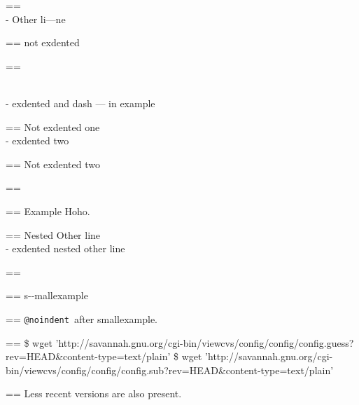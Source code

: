 \documentclass{book}
\makeatletter
\newenvironment{Texinfopreformatted}{%
  \par\GNUTobeylines\obeyspaces\frenchspacing\parskip=\z@\parindent=\z@}{}
{\catcode`\^^M=13 \gdef\GNUTobeylines{\catcode`\^^M=13 \def^^M{\null\par}}}
\newenvironment{Texinfoindented}{\begin{list}{}{}\item\relax}{\end{list}}
\renewcommand{\_}{\Texinfounderscore\discretionary{}{}{}}
\makeatother
\begin{document}
\begin{Texinfoindented}
\begin{Texinfoindented}
\begin{Texinfopreformatted}
\end{Texinfopreformatted}
\leavevmode{}\\
\hbox{\kern -\leftmargin}%
Other li---ne
\\
\begin{Texinfopreformatted}%
\ttfamily not exdented
\end{Texinfopreformatted}
\end{Texinfoindented}
\begin{Texinfopreformatted}%
\ttfamily 
\end{Texinfopreformatted}
\begin{Texinfoindented}
\leavevmode{}\\
\hbox{\kern -\leftmargin}%
exdented  and dash --- in example
\\
\begin{Texinfopreformatted}%
\ttfamily Not exdented one
\end{Texinfopreformatted}
\leavevmode{}\\
\hbox{\kern -\leftmargin}%
exdented two
\\
\begin{Texinfopreformatted}%
\ttfamily Not exdented two
\end{Texinfopreformatted}
\end{Texinfoindented}
\begin{Texinfopreformatted}%
\ttfamily 
\end{Texinfopreformatted}
\begin{Texinfoindented}
\begin{Texinfopreformatted}%
\ttfamily Example   Hoho.
\end{Texinfopreformatted}
\begin{Texinfoindented}
\begin{Texinfopreformatted}%
\ttfamily Nested Other line
\end{Texinfopreformatted}
\leavevmode{}\\
\hbox{\kern -\leftmargin}%
exdented nested other line
\\
\end{Texinfoindented}
\end{Texinfoindented}
\begin{Texinfopreformatted}%
\ttfamily 
\end{Texinfopreformatted}
\begin{Texinfopreformatted}%
\ttfamily \footnotesize s{-}{-}mallexample
\end{Texinfopreformatted}
\begin{Texinfopreformatted}%
\ttfamily 
\texttt{@noindent}\ after smallexample.
\end{Texinfopreformatted}
\begin{Texinfopreformatted}%
\ttfamily \footnotesize \$ wget 'http://savannah.gnu.org/cgi-bin/viewcvs/config/config/config.guess?rev=HEAD\&content-type=text/plain'
\$ wget 'http://savannah.gnu.org/cgi-bin/viewcvs/config/config/config.sub?rev=HEAD\&content-type=text/plain'
\end{Texinfopreformatted}
\begin{Texinfopreformatted}%
\ttfamily \noindent{}Less recent versions are also present.


\end{Texinfopreformatted}
\end{Texinfoindented}
\end{document}
